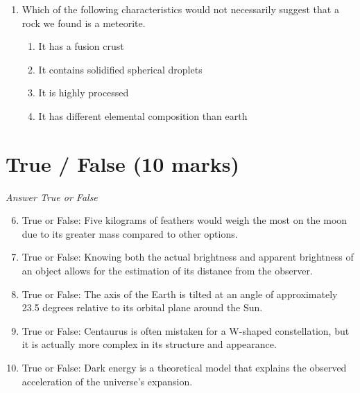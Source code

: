 \documentclass[12pt]{article}
\begin{document}
\begin{enumerate}[label=\arabic*.]
\begin{enumerate}[label=(\alph*)]
    \item Hubble Space Telescope images that resolved Pluto's disk
    \item brightness measurements made during mutual eclipses of Pluto and Charon
    \item radar observations made by the Arecibo telescope
\end{enumerate}
\item Which of the following characteristics would not necessarily suggest that a rock we found is a meteorite.
\begin{enumerate}[label=(\alph*)]
    \item It has a fusion crust
    \item It contains solidified spherical droplets
    \item It is highly processed
    \item It has different elemental composition than earth
\end{enumerate}
\end{enumerate}

\section*{True / False (10 marks)}
\textit{Answer True or False}
\begin{enumerate}[label=\arabic*.]
\setcounter{enumi}{5}
\item True or False: Five kilograms of feathers would weigh the most on the moon due to its greater mass compared to other options.
\item True or False: Knowing both the actual brightness and apparent brightness of an object allows for the estimation of its distance from the observer.
\item True or False: The axis of the Earth is tilted at an angle of approximately 23.5 degrees relative to its orbital plane around the Sun.
\item True or False: Centaurus is often mistaken for a W-shaped constellation, but it is actually more complex in its structure and appearance.
\item True or False: Dark energy is a theoretical model that explains the observed acceleration of the universe's expansion.
\end{enumerate}
\end{document}
